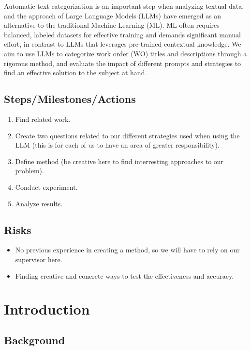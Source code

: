 \documentclass{article}
\begin{document}
Automatic text categorization is an important step when analyzing textual data,
and the approach of Large Language Models (LLMs) have emerged as an alternative
to the traditional Machine Learning (ML).
ML often requires balanced, labeled datasets for effective training
and demands significant manual effort, in contrast to LLMs that
leverages pre-trained contextual knowledge.
We aim to use LLMs to categorize work order (WO) titles and descriptions
through a rigorous method,
and evaluate the impact of different prompts and strategies to find
an effective solution to the subject at hand.

\subsection{Steps/Milestones/Actions}

\begin{enumerate}
      \item Find related work.
      \item Create two questions related to our different strategies used
            when using the LLM (this is for each of us to have an area of
            greater responsibility).
      \item Define method (be creative here to find interresting approaches
            to our problem).
      \item Conduct experiment.
      \item Analyze results.
\end{enumerate}

\subsection{Risks}

\begin{itemize}
      \item No previous experience in creating a method, so we will have to rely on our
            supervisor here.
      \item Finding creative and concrete ways to test the effectiveness and accuracy.
\end{itemize}

\section{Introduction}

\subsection{Background}
\end{document}
